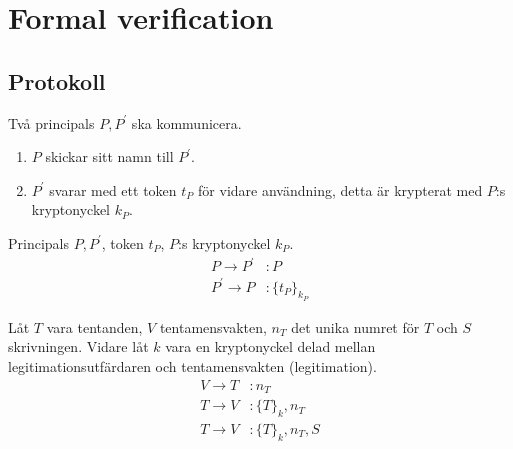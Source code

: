 \mode*




\section{Formal verification}

\subsection{Protokoll}

\begin{frame}
  \begin{example}[Protokollbeskrivning]
    Två principals \(P, P^\prime\) ska kommunicera.
    \begin{enumerate}
      \item \(P\) skickar sitt namn till \(P^\prime\).
      \item \(P^\prime\) svarar med ett token \(t_P\) för vidare användning, 
        detta är krypterat med \(P\):s kryptonyckel \(k_P\).
    \end{enumerate}
  \end{example}

  \pause{}

  \begin{example}
    Principals \(P, P^\prime\), token \(t_P\), \(P\):s kryptonyckel \(k_P\).
    \begin{align*}
      P\to P^\prime&\colon P \\
      P^\prime\to P&\colon \{t_P\}_{k_P}
    \end{align*}
  \end{example}
\end{frame}

\begin{frame}
  \begin{example}
    Låt \(T\) vara tentanden, \(V\) tentamensvakten, \(n_T\) det unika numret 
    för \(T\) och \(S\) skrivningen.
    Vidare låt \(k\) vara en kryptonyckel delad mellan legitimationsutfärdaren 
    och tentamensvakten (legitimation).
    \begin{align*}
      V\to T&\colon n_T \\
      T\to V&\colon \{T\}_k, n_T \\
      T\to V&\colon \{T\}_k, n_T, S
    \end{align*}
  \end{example}
\end{frame}

